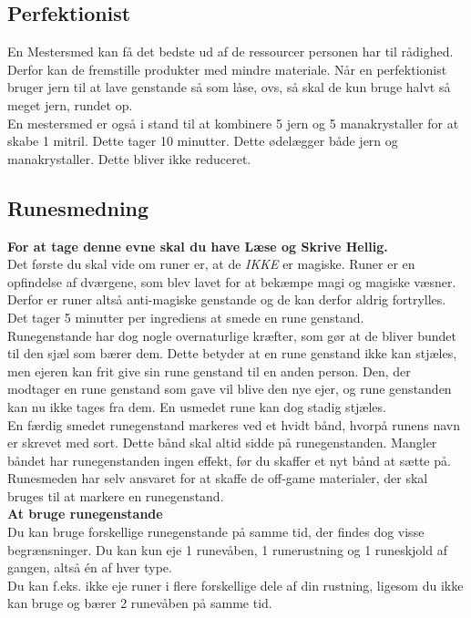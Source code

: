 \subsection*{Perfektionist}
En Mestersmed kan få det bedste ud af de ressourcer personen har til rådighed. Derfor kan de fremstille produkter med mindre materiale. Når en perfektionist bruger jern til at lave genstande så som låse, ovs, så skal de kun bruge halvt så meget jern, rundet op.\\

En mestersmed er også i stand til at kombinere 5 jern og 5 manakrystaller for at skabe 1 mitril. Dette tager 10 minutter. Dette ødelægger både jern og manakrystaller. Dette bliver ikke reduceret.\\


\subsection*{Runesmedning}
\textbf{For at tage denne evne skal du have Læse og Skrive Hellig.}\\
Det første du skal vide om runer er, at de \emph{IKKE} er magiske. Runer er en opfindelse af dværgene, som blev lavet for at bekæmpe magi og magiske væsner. Derfor er runer altså anti-magiske genstande og de kan derfor aldrig fortrylles.\\
Det tager 5 minutter per ingrediens at smede en rune genstand.\\
Runegenstande har dog nogle overnaturlige kræfter, som gør at de bliver bundet til den sjæl som bærer dem. Dette betyder at en rune genstand ikke kan stjæles, men ejeren kan frit give sin rune genstand til en anden person. Den, der modtager en rune genstand som gave vil blive den nye ejer, og rune genstanden kan nu ikke tages fra dem. En usmedet rune kan dog stadig stjæles.\\

En færdig smedet runegenstand markeres ved et hvidt bånd, hvorpå runens navn er skrevet med sort. Dette bånd skal altid sidde på runegenstanden. Mangler båndet har runegenstanden ingen effekt, før du skaffer et nyt bånd at sætte på. Runesmeden har selv ansvaret for at skaffe de off-game materialer, der skal bruges til at markere en runegenstand.\\

\textbf{At bruge runegenstande}\\
Du kan bruge forskellige runegenstande på samme tid, der findes dog visse begrænsninger. Du kan
kun eje 1 runevåben, 1 runerustning og 1 runeskjold af gangen, altså én af hver type.\\
Du kan f.eks. ikke eje runer i flere forskellige dele af din rustning, ligesom du ikke kan bruge og bærer 2 runevåben på samme tid.\\

